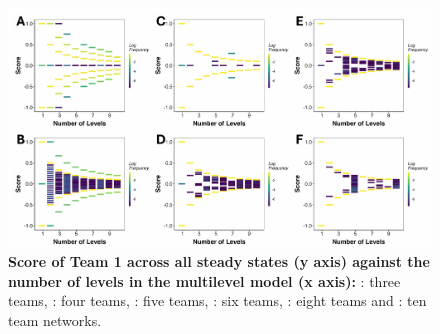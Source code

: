 \documentclass[11pt,a4paper]{article}
\theoremstyle{definition}
\theoremstyle{remark}
\begin{document}
\begin{figure}[h]
    \centering
    \begin{subfigure}[c]{\textwidth}
        \label{Team3-mlvl-score}
    \end{subfigure}
    \begin{subfigure}[c]{\textwidth}
        \label{Team4-mlvl-score}
    \end{subfigure}
    \begin{subfigure}[c]{\textwidth}
        \label{Team5-mlvl-score}
    \end{subfigure}
    \begin{subfigure}[c]{\textwidth}
        \label{Team6-mlvl-score}
    \end{subfigure}
    \begin{subfigure}[c]{\textwidth}
        \label{Team8-mlvl-score}
    \end{subfigure}
    \begin{subfigure}[c]{\textwidth}
        \label{Team10-mlvl-score}
    \end{subfigure}
    \includegraphics[width=\textwidth]{figures/FigureSY} 
    \caption{\textbf{Score of Team 1 across all steady states (y axis) against the number of levels in the multilevel model (x axis):} : three teams, : four teams, : five teams, : six teams, : eight teams and : ten team networks.}
    \label{multlvl-scorevlvl}
\end{figure}
\end{document}
